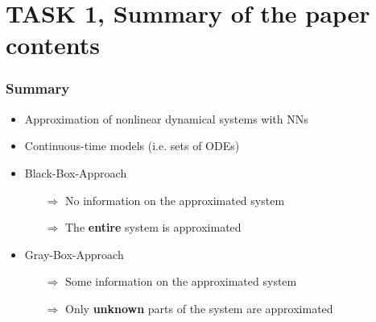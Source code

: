 \section{TASK 1, Summary of the paper contents}

\begin{frame}
	\frametitle{Summary}
	\begin{itemize}
		\item Approximation of nonlinear dynamical systems with NNs
		\item Continuous-time models (i.e. sets of ODEs)
		\item Black-Box-Approach
		\begin{itemize}
			\item[$\Rightarrow$] No information on the approximated system
			\item[$\Rightarrow$] The \textbf{entire} system is approximated
		\end{itemize}
		\item Gray-Box-Approach
		\begin{itemize}
			\item[$\Rightarrow$] Some information on the approximated system
			\item[$\Rightarrow$] Only \textbf{unknown} parts of the system are approximated
		\end{itemize}
	\end{itemize}
\end{frame}

